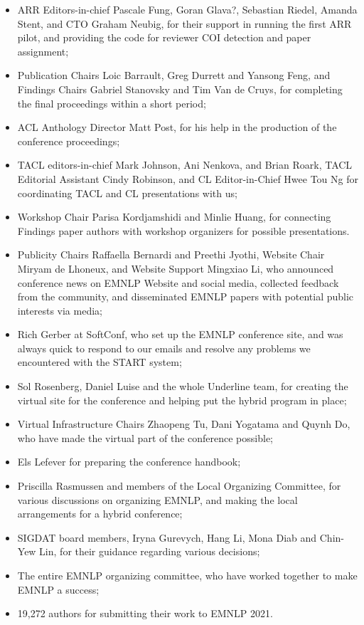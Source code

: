 \begin{itemize}
\item ARR Editors-in-chief Pascale Fung, Goran Glava?, Sebastian Riedel, Amanda Stent, and CTO Graham Neubig, for their support in running the first ARR pilot, and providing the code for reviewer COI detection and paper assignment;
\item Publication Chairs Loic Barrault, Greg Durrett and Yansong Feng, and Findings Chairs Gabriel Stanovsky and Tim Van de Cruys, for completing the final proceedings within a short period;
\item ACL Anthology Director Matt Post, for his help in the production of the conference proceedings;
\item TACL editors-in-chief Mark Johnson, Ani Nenkova, and Brian Roark, TACL Editorial Assistant Cindy Robinson, and CL Editor-in-Chief Hwee Tou Ng for coordinating TACL and CL presentations with us;
\item Workshop Chair Parisa Kordjamshidi and Minlie Huang, for connecting Findings paper authors with workshop organizers for possible presentations.
\item Publicity Chairs Raffaella Bernardi and Preethi Jyothi, Website Chair Miryam de Lhoneux, and Website Support Mingxiao Li, who announced conference news on EMNLP Website and social media, collected feedback from the community, and disseminated EMNLP papers with potential public interests via media;
\item Rich Gerber at SoftConf, who set up the EMNLP conference site, and was always quick to respond to our emails and resolve any problems we encountered with the START system;
\item Sol Rosenberg, Daniel Luise and the whole Underline team, for creating the virtual site for the conference and helping put the hybrid program in place;
\item Virtual Infrastructure Chairs Zhaopeng Tu, Dani Yogatama and Quynh Do, who have made the virtual part of the conference possible;
\item Els Lefever for preparing the conference handbook;
\item Priscilla Rasmussen and members of the Local Organizing Committee, for various discussions on organizing EMNLP, and making the local arrangements for a hybrid conference;
\item SIGDAT board members, Iryna Gurevych, Hang Li, Mona Diab and Chin-Yew Lin, for their guidance regarding various decisions;
\item The entire EMNLP organizing committee, who have worked together to make EMNLP a success;
\item 19,272 authors for submitting their work to EMNLP 2021.

\end{itemize}

